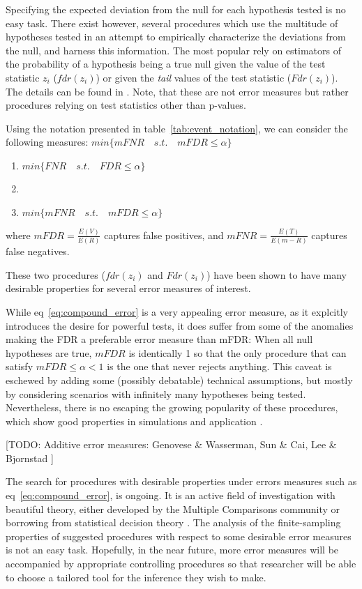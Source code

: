 \documentclass[review,12pt]{article}
\begin{document}
Specifying the expected deviation from the null for each hypothesis tested is no easy task. There exist however, several procedures which use the multitude of hypotheses tested in an attempt to empirically characterize the deviations from the null, and harness this information. The most popular rely on estimators of the probability of a hypothesis being a true null given the value of the test statistic $z_i$ ($fdr(z_i)$) or given the \emph{tail} values of the test statistic ($Fdr(z_i)$). The details can be found in \cite{efron_microarrays_2008}. Note, that these are not error measures but rather procedures relying on test statistics other than p-values.  

Using the notation presented in table~\ref{tab:event_notation}, we can consider the following measures:
$min\{mFNR \quad s.t. \quad mFDR\leq \alpha \}$


\begin{enumerate}
\item $min\{FNR \quad s.t. \quad FDR\leq \alpha \}$
\item 
\item $min\{mFNR \quad s.t. \quad mFDR\leq \alpha \}$
\end{enumerate}

where $mFDR=\frac{E(V)}{E(R)}$ captures false positives, and 
$mFNR=\frac{E(T)}{E(m-R)}$ captures false negatives.


These two procedures ($fdr(z_i)$ and $Fdr(z_i)$) have been shown to have many desirable properties for several error measures of interest.


While eq~\ref{eq:compound_error} is a very appealing error measure, as it explcitly introduces the desire for powerful tests, it does suffer from some of the anomalies making the FDR a preferable error measure than mFDR: When all null hypotheses are true, $mFDR$ is identically 1 so that the only procedure that can satisfy $mFDR\leq \alpha <1$ is the one that never rejects anything. This caveat is eschewed by adding some (possibly debatable) technical assumptions, but mostly by considering scenarios with infinitely many hypotheses being tested. Nevertheless, there is no escaping the growing popularity of these procedures, which show good properties in simulations and application \citep[example][]{efron_microarrays_2008}.

[TODO: Additive error measures: Genovese \& Wasserman, Sun \& Cai, Lee \& Bjornstad ]


The search for procedures with desirable properties under errors measures such as eq~\ref{eq:compound_error}, is ongoing. It is an active field of investigation with beautiful theory, either developed by the Multiple Comparisons community or borrowing from statistical decision theory \cite[see][]{sun_oracle_2007}. The analysis of the finite-sampling properties of suggested procedures with respect to some desirable error measures is not an easy task. Hopefully, in the near future, more error measures will be accompanied by appropriate controlling procedures so that researcher will be able to choose a tailored tool for the inference they wish to make.
\end{document}
